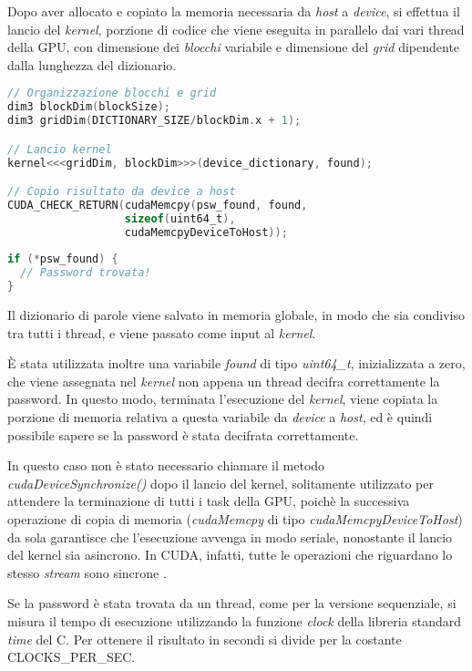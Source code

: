 \documentclass[10pt,twocolumn,letterpaper]{article}
\begin{document}
Dopo aver allocato e copiato la memoria necessaria da \textit{host} a \textit{device}, si effettua il lancio del \textit{kernel}, porzione di codice che viene eseguita in parallelo dai vari thread della GPU, con dimensione dei \textit{blocchi} variabile e dimensione del \textit{grid} dipendente dalla lunghezza del dizionario.
\newline

\begin{lstlisting}[basicstyle=\scriptsize, language=C, frame=single, caption={Esempio di lancio del kernel in CUDA},captionpos=b]
// Organizzazione blocchi e grid
dim3 blockDim(blockSize);
dim3 gridDim(DICTIONARY_SIZE/blockDim.x + 1);

// Lancio kernel
kernel<<<gridDim, blockDim>>>(device_dictionary, found);

// Copio risultato da device a host
CUDA_CHECK_RETURN(cudaMemcpy(psw_found, found, 
                  sizeof(uint64_t), 
                  cudaMemcpyDeviceToHost));
                  
if (*psw_found) {
  // Password trovata!
}
\end{lstlisting}

Il dizionario di parole viene salvato in memoria globale, in modo che sia condiviso tra tutti i thread, e viene passato come input al \textit{kernel}.

È stata utilizzata inoltre una variabile \textit{found} di tipo \textit{uint64\_t}, inizializzata a zero, che viene assegnata nel \textit{kernel} non appena un thread decifra correttamente la password. In questo modo, terminata l'esecuzione del \textit{kernel}, viene copiata la porzione di memoria relativa a questa variabile da \textit{device} a \textit{host}, ed è quindi possibile sapere se la password è stata decifrata correttamente.

In questo caso non è stato necessario chiamare il metodo \textit{cudaDeviceSynchronize()} dopo il lancio del kernel, solitamente utilizzato per attendere la terminazione di tutti i task della GPU, poichè la successiva operazione di copia di memoria (\textit{cudaMemcpy} di tipo \textit{cudaMemcpyDeviceToHost}) da sola garantisce che l'esecuzione avvenga in modo seriale, nonostante il lancio del kernel sia asincrono. 
In CUDA, infatti, tutte le operazioni che riguardano lo stesso \textit{stream} sono sincrone \cite{CUDA_SYNC}.

Se la password è stata trovata da un thread, come per la versione sequenziale, si misura il tempo di esecuzione utilizzando la funzione \textit{clock} della libreria standard \textit{time} del C. Per ottenere il risultato in secondi si divide per la costante CLOCKS\_PER\_SEC.\newline
\end{document}
